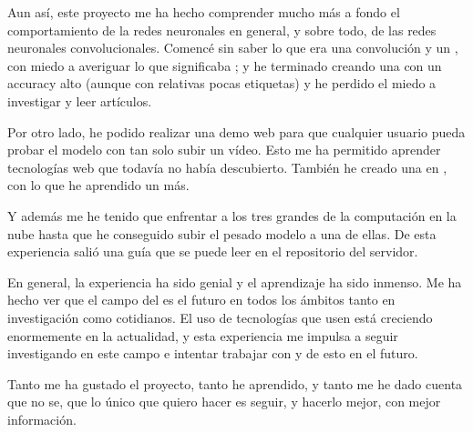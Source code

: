 Aun así, este proyecto me ha hecho comprender mucho más a fondo el comportamiento de la redes neuronales en general, y sobre todo, de las redes neuronales convolucionales. Comencé sin saber lo que era una convolución y un , con miedo a averiguar lo que significaba ; y he terminado creando una  con un accuracy alto (aunque con relativas pocas etiquetas) y he perdido el miedo a investigar y leer artículos.

Por otro lado, he podido realizar una demo web para que cualquier usuario pueda probar el modelo con tan solo subir un vídeo. Esto me ha permitido aprender tecnologías web que todavía no había descubierto. También he creado una  en , con lo que he aprendido un  más.

Y además me he tenido que enfrentar a los tres grandes de la computación en la nube hasta que he conseguido subir el pesado modelo a una de ellas. De esta experiencia salió una guía que se puede leer en el repositorio del servidor.

En general, la experiencia ha sido genial y el aprendizaje ha sido inmenso. Me ha hecho ver que el campo del  es el futuro en todos los ámbitos tanto en investigación como cotidianos. El uso de tecnologías que usen  está creciendo enormemente en la actualidad, y esta experiencia me impulsa a seguir investigando en este campo e intentar trabajar con y de esto en el futuro.

Tanto me ha gustado el proyecto, tanto he aprendido, y tanto me he dado cuenta que no se, que lo único que quiero hacer es seguir, y hacerlo mejor, con mejor información.
